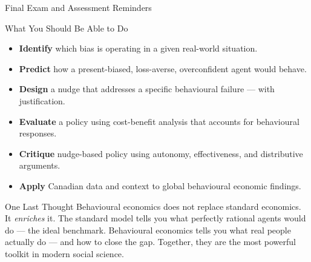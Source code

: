 \documentclass[aspectratio=169]{beamer}
\begin{document}
\begin{frame}{Final Exam and Assessment Reminders}
\begin{block}{What You Should Be Able to Do}
\begin{itemize}
  \item \textbf{Identify} which bias is operating in a given real-world situation.
  \item \textbf{Predict} how a present-biased, loss-averse, overconfident agent would behave.
  \item \textbf{Design} a nudge that addresses a specific behavioural failure --- with justification.
  \item \textbf{Evaluate} a policy using cost-benefit analysis that accounts for behavioural responses.
  \item \textbf{Critique} nudge-based policy using autonomy, effectiveness, and distributive arguments.
  \item \textbf{Apply} Canadian data and context to global behavioural economic findings.
\end{itemize}
\end{block}
\begin{alertblock}{One Last Thought}
Behavioural economics does not replace standard economics. It \textit{enriches} it. The standard model tells you what perfectly rational agents would do --- the ideal benchmark. Behavioural economics tells you what real people actually do --- and how to close the gap. Together, they are the most powerful toolkit in modern social science.
\end{alertblock}
\end{frame}
\end{document}
